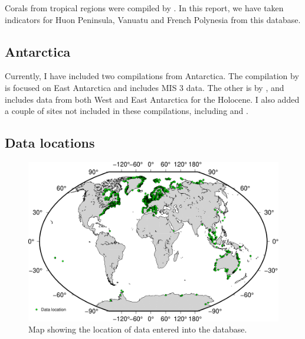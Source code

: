 Corals from tropical regions were compiled by \citet{HibbertEtal2016}. In this report, we have taken indicators for Huon Peninsula, Vanuatu and French Polynesia from this database.

\subsection{Antarctica}

Currently, I have included two compilations from Antarctica. The compilation by \citet{IshiwaEtal2021} is focused on East Antarctica and includes MIS 3 data. The other is by \citet{BriggsTarasov2013}, and includes data from both West and East Antarctica for the Holocene. I also added a couple of sites not included in these compilations, including \citet{HjortEtal1997} and \citet{BraddockEtal2022}.

\clearpage

\subsection{Data locations}

\begin{figure}[h]
\includegraphics[width=\textwidth]{../GIS/data_map.pdf}
\caption{Map showing the location of data entered into the database.}
\label{fig:data_map}
\end{figure}

\clearpage
